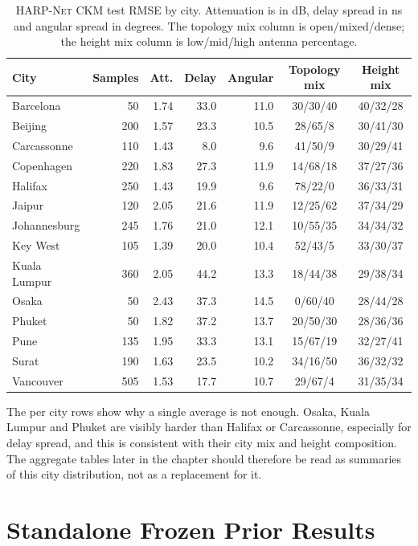 \begin{table}[!htbp]
\centering
\caption[\textsc{HARP-Net CKM} test RMSE by city.]%
{\textsc{HARP-Net CKM} test RMSE by city. Attenuation is in dB, delay spread
in ns and angular spread in degrees. The topology mix column is
open/mixed/dense; the height mix column is low/mid/high antenna percentage.}
\label{tab:try80_test_city_audit}
\scriptsize
\begin{tabularx}{\textwidth}{>{\raggedright\arraybackslash}Xrrrrcc}
\toprule
City & Samples & Att. & Delay & Angular & Topology mix & Height mix \\
\midrule
Barcelona & 50 & 1.74 & 33.0 & 11.0 & 30/30/40 & 40/32/28 \\
Beijing & 200 & 1.57 & 23.3 & 10.5 & 28/65/8 & 30/41/30 \\
Carcassonne & 110 & 1.43 & 8.0 & 9.6 & 41/50/9 & 30/29/41 \\
Copenhagen & 220 & 1.83 & 27.3 & 11.9 & 14/68/18 & 37/27/36 \\
Halifax & 250 & 1.43 & 19.9 & 9.6 & 78/22/0 & 36/33/31 \\
Jaipur & 120 & 2.05 & 21.6 & 11.9 & 12/25/62 & 37/34/29 \\
Johannesburg & 245 & 1.76 & 21.0 & 12.1 & 10/55/35 & 34/34/32 \\
Key West & 105 & 1.39 & 20.0 & 10.4 & 52/43/5 & 33/30/37 \\
Kuala Lumpur & 360 & 2.05 & 44.2 & 13.3 & 18/44/38 & 29/38/34 \\
Osaka & 50 & 2.43 & 37.3 & 14.5 & 0/60/40 & 28/44/28 \\
Phuket & 50 & 1.82 & 37.2 & 13.7 & 20/50/30 & 28/36/36 \\
Pune & 135 & 1.95 & 33.3 & 13.1 & 15/67/19 & 32/27/41 \\
Surat & 190 & 1.63 & 23.5 & 10.2 & 34/16/50 & 36/32/32 \\
Vancouver & 505 & 1.53 & 17.7 & 10.7 & 29/67/4 & 31/35/34 \\
\bottomrule
\end{tabularx}
\end{table}

The per city rows show why a single average is not enough. Osaka, Kuala Lumpur
and Phuket are visibly harder than Halifax or Carcassonne, especially for delay
spread, and this is consistent with their city mix and height composition. The
aggregate tables later in the chapter should therefore be read as summaries of
this city distribution, not as a replacement for it.

\section{Standalone Frozen Prior Results}

